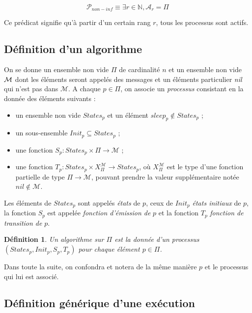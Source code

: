 \documentclass{article}
\newtheorem{definition}{Définition}
\begin{document}
$$\mathcal{P}_{non-inf} \equiv \exists r \in \mathds{N}, \mathcal{A}_r = \Pi$$

Ce prédicat signifie qu'à partir d'un certain rang $r$, tous les processus sont actifs.

\subsection{Définition d'un algorithme}

On se donne un ensemble non vide $\Pi$ de cardinalité $n$ et  un ensemble non vide ${\cal M}$ dont les éléments seront appel\'es des
	messages et un éléments particulier {\em nil} qui n'est pas dans $\mathcal{M}$.
A chaque  $p \in \Pi$,  on associe  un {\em processus} consistant en la donnée des éléments suivants :
	\begin{itemize}
	\item un ensemble non vide $States_p$ et un  \'el\'ement $sleep_p \notin States_p$ ;
	\item un sous-ensemble   $Init_p \subseteq States_p$ ;
	\item une fonction $S_p : States_p \times \Pi \rightarrow \mathcal{M}$ ;
	\item une fonction 
		$T_p : States_p \times X_\Pi^\mathcal{M}
	  \rightarrow States_p$,
	  où  $X_\Pi^\mathcal{M}$ est le type d'une fonction partielle
			de type $\Pi \rightarrow \mathcal{M}$, pouvant prendre la valeur supplémentaire notée $nil \notin \mathcal{M}$.
	\end{itemize}
Les éléments de 	$States_p$  sont appel\'es \emph{\'etats} de $p$, ceux de $Init_p$ \emph{\'etats initiaux} de $p$,
	la fonction $S_p$ est appel\'ee \emph{fonction d'émission de} $p$ et la fonction $T_p$ \emph{fonction de transition de} $p$.

\begin{definition}\label{def:algo}
Un algorithme  sur $\Pi$ est la donn\'ee d'un processus $(States_p, Init_p, S_p,T_p)$ pour chaque  \'el\'ement $p \in \Pi$.
\end{definition}
\noindent Dans toute la suite, on confondra et notera de la m\^eme mani\`ere $p$ et le processus qui lui est associ\'e.

\subsection{Définition générique d'une exécution}
\end{document}
